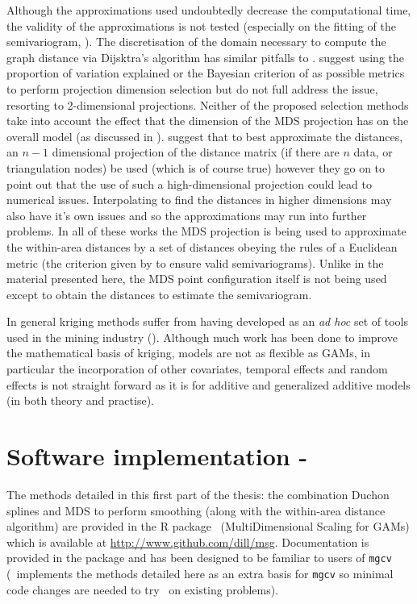 Although the approximations used undoubtedly decrease the computational time, the validity of the approximations is not tested (especially on the fitting of the semivariogram, \cite{crabkrig}). The discretisation of the domain necessary to compute the graph distance via Dijsktra's algorithm has similar pitfalls to .  suggest using the proportion of variation explained or the Bayesian criterion of  as possible metrics to perform projection dimension selection but do not full address the issue, resorting to 2-dimensional projections. Neither of the proposed selection methods take into account the effect that the dimension of the MDS projection has on the overall model (as discussed in ).   suggest that to best approximate the distances, an $n-1$ dimensional projection of the distance matrix (if there are $n$ data, or triangulation nodes) be used (which is of course true) however they go on to point out that the use of such a high-dimensional projection could lead to numerical issues. Interpolating to find the distances in higher dimensions may also have it's own issues and so the approximations may run into further problems. In all of these works the MDS projection is being used to approximate the within-area distances by a set of distances obeying the rules of a Euclidean metric (the criterion given by \cite{curriero} to ensure valid semivariograms). Unlike in the material presented here, the MDS point configuration itself is not being used except to obtain the distances to estimate the semivariogram.

In general kriging methods suffer from having developed as an \textit{ad hoc} set of tools used in the mining industry (\cite[preface]{diggle}). Although much work has been done to improve the mathematical basis of kriging, models are not as flexible as GAMs, in particular the incorporation of other covariates, temporal effects and random effects is not straight forward as it is for additive and generalized additive models (in both theory and practise).

\section{Software implementation - \mdspack}
\label{gds-software}

The methods detailed in this first part of the thesis: the combination Duchon splines and MDS to perform smoothing (along with the within-area distance algorithm) are provided in the \textsf{R} package \mdspack\ (MultiDimensional Scaling for GAMs) which is available at \url{http://www.github.com/dill/msg}. Documentation is provided in the package and has been designed to be familiar to users of \texttt{mgcv} (\mdspack\ implements the methods detailed here as an extra basis for \texttt{mgcv} so minimal code changes are needed to try \mdsds\ on existing problems).

